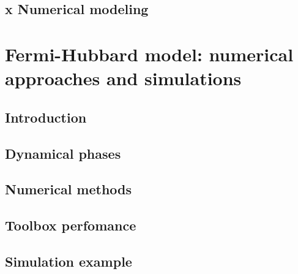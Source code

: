 \documentclass[twoside]{article}
\begin{document}
\subsection{x Numerical modeling}


\newpage
\section{Fermi-Hubbard model: numerical approaches and simulations} \label{sec:fhmodel}

\subsection{Introduction}

\subsection{Dynamical phases}

\subsection{Numerical methods}

\subsection{Toolbox perfomance}

\subsection{Simulation example}





\newpage


\end{document}

